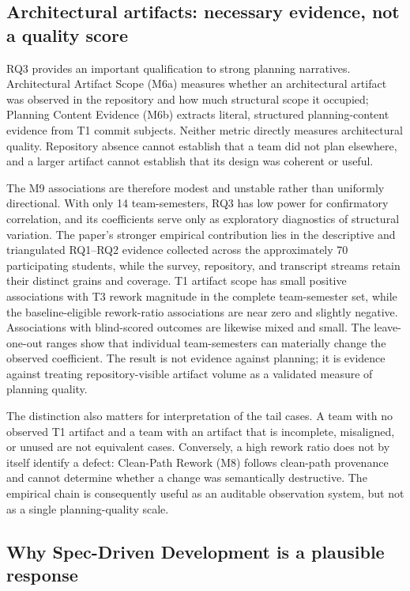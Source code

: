 \subsection{Architectural artifacts: necessary evidence, not a quality score}

RQ3 provides an important qualification to strong planning narratives.
Architectural Artifact Scope (M6a)
measures whether an architectural artifact was observed in the repository and
how much structural scope it occupied; Planning Content Evidence (M6b) extracts
literal, structured planning-content evidence from T1 commit subjects. Neither
metric directly
measures architectural quality. Repository absence cannot establish that a team
did not plan elsewhere, and a larger artifact cannot establish that its design
was coherent or useful.

The M9 associations are therefore modest and unstable
rather than uniformly directional. With only 14 team-semesters, RQ3 has low
power for confirmatory correlation, and its coefficients serve only as
exploratory diagnostics of structural variation. The paper's stronger
empirical contribution lies in the descriptive and triangulated RQ1--RQ2
evidence collected across the approximately 70 participating students, while
the survey, repository, and transcript streams retain their distinct grains
and coverage. T1 artifact scope has small positive
associations with T3 rework magnitude in the complete team-semester set, while
the baseline-eligible rework-ratio associations are near zero and slightly
negative. Associations with blind-scored outcomes are likewise mixed and small.
The leave-one-out ranges show that individual team-semesters can materially
change the observed coefficient. The result is not evidence against planning;
it is evidence against treating repository-visible artifact volume as a
validated measure of planning quality.

The distinction also matters for interpretation of the tail cases. A team with
no observed T1 artifact and a team with an artifact that is incomplete,
misaligned, or unused are not equivalent cases. Conversely, a high rework ratio
does not by itself identify a defect: Clean-Path Rework (M8) follows clean-path provenance and
cannot determine whether a change was semantically destructive. The empirical
chain is consequently useful as an auditable observation system, but not as a
single planning-quality scale.

\subsection{Why Spec-Driven Development is a plausible response}

